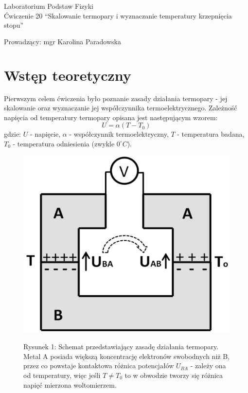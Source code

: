 \documentclass[polish, 11pt, a4paper]{article}
\begin{document}
	\begin{titlepage}
	\centering
	\Huge Laboratorium Podstaw Fizyki\\
	\vspace{1cm}
	\huge Ćwiczenie 20 \enquote{Skalowanie termopary i wyznaczanie temperatury krzepnięcia stopu}\\
	\vspace{1cm}
	\raggedright
	\huge Prowadzący: mgr Karolina Paradowska\\
	\vspace{.5cm}
	\begin{table}[h]
		\centering
	\end{table}
	\end{titlepage}
	\section{Wstęp teoretyczny}
		\RaggedRight
		Pierwszym celem ćwiczenia było poznanie zasady działania termopary - jej skalowanie oraz wyznaczanie jej współczynnika termoelektrycznego.
		Zależność napięcia od temperatury termopary opisana jest następującym wzorem:
		\begin{equation}
			U=\alpha(T-T_0)
		\end{equation}
		gdzie: \(U\) - napięcie, \(\alpha\) - współczynnik termoelektryczny, \(T\) - temperatura badana, \(T_0\) - temperatura odniesienia (zwykle \(0^\circ C\)).
		
		\begin{figure}[H]
			\centering
			\includegraphics[width=.5\textwidth]{Fizyka20Rysunek1}
			
			Rysunek 1: Schemat przedstawiający zasadę działania termopary. Metal A posiada większą koncentrację elektronów swobodnych niż B, przez co powstaje kontaktowa różnica potencjałów \(U_{BA}\) - zależy ona od temperatury, więc jeśli \(T\neq T_0\) to w obwodzie tworzy się różnica napięć mierzona woltomierzem.
		\end{figure}
		
\end{document}
